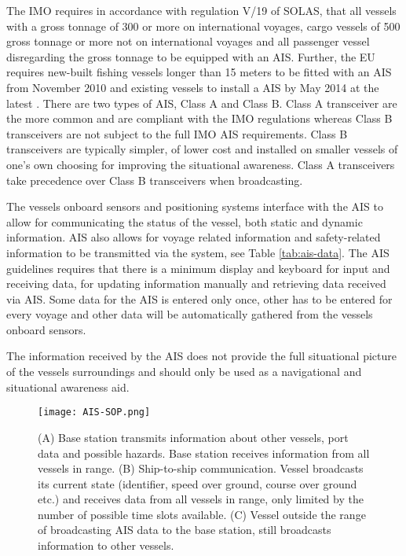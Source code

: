 \documentclass[../main.tex]{subfiles}
\begin{document}
The IMO requires in accordance with regulation V/19 of SOLAS, that all vessels with a gross tonnage of 300 or more on international voyages, cargo vessels of 500 gross tonnage or more not on international voyages and all passenger vessel disregarding the gross tonnage to be equipped with an AIS. Further, the EU requires new-built fishing vessels longer than 15 meters to be fitted with an AIS from November 2010 and existing vessels to install a AIS by May 2014 at the latest \cite{EU_2011}. There are two types of AIS, Class A and Class B. Class A transceiver are the more common and are compliant with the IMO regulations whereas Class B transceivers are not subject to the full IMO AIS requirements. Class B transceivers are typically simpler, of lower cost and installed on smaller vessels of one's own choosing for improving the situational awareness. Class A transceivers take precedence over Class B transceivers when broadcasting.

The vessels onboard sensors and positioning systems interface with the AIS to allow for communicating the status of the vessel, both static and dynamic information. AIS also allows for voyage related information and safety-related information to be transmitted via the system, see Table \ref{tab:ais-data}. The AIS guidelines requires that there is a minimum display and keyboard for input and receiving data, for updating information manually and retrieving data received via AIS. Some data for the AIS is entered only once, other has to be entered for every voyage and other data will be automatically gathered from the vessels onboard sensors.

The information received by the AIS does not provide the full situational picture of the vessels surroundings and should only be used as a navigational and situational awareness aid.

\begin{figure}[H]
\centering
\texttt{[image: AIS-SOP.png]}
\caption{(A) Base station transmits information about other vessels, port data and possible hazards. Base station receives information from all vessels in range. (B) Ship-to-ship communication. Vessel broadcasts its current state (identifier, speed over ground, course over ground etc.) and receives data from all vessels in range, only limited by the number of possible time slots available. (C) Vessel outside the range of broadcasting AIS data to the base station, still broadcasts information to other vessels.}
\label{fig:ais-sop}
\end{figure}
\end{document}
